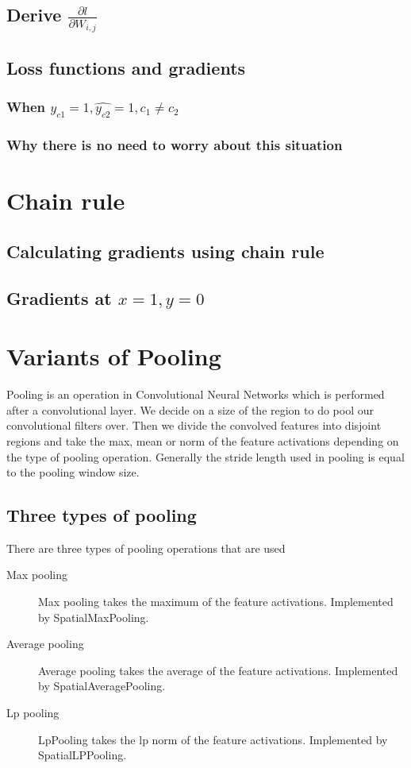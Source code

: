 \documentclass{article}
\begin{document}
\subsection{Derive $\frac{\partial l}{\partial W_{i,j}}$}
\subsection{Loss functions and gradients}
\subsubsection{When $y_{c1} = 1, \hat{y_{c2}} = 1, c_{1} \ne c_{2}$}
\subsubsection{Why there is no need to worry about this situation}

\section{Chain rule}
\subsection{Calculating gradients using chain rule}
\subsection{Gradients at $x = 1, y = 0$}

\section{Variants of Pooling}
Pooling is an operation in Convolutional Neural Networks which is performed after a convolutional layer.  
We decide on a size of the region to do pool our convolutional filters over.
Then we divide the convolved features into disjoint regions and take the max, mean or norm of the feature activations depending on the type of pooling operation.
Generally the stride length used in pooling is equal to the pooling window size.
\subsection{Three types of pooling}
There are three types of pooling operations that are used
\begin{description}
  \item[Max pooling] Max pooling takes the maximum of the feature activations.  Implemented by \mbox{SpatialMaxPooling}.
  \item[Average pooling] Average pooling takes the average of the feature activations. Implemented by \mbox{SpatialAveragePooling}.
  \item[Lp pooling] LpPooling takes the lp norm of the feature activations. Implemented by \mbox{SpatialLPPooling}.
\end{description}
\end{document}
